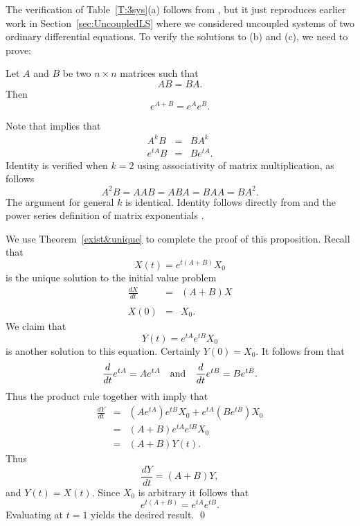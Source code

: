 The verification of Table~\ref{T:3sys}(a) follows from , but
it just reproduces earlier work in Section~\ref{sec:UncoupledLS} where we
considered uncoupled systems of two ordinary differential equations.
To verify the solutions to (b) and (c), we need to prove:

\begin{prop}  \label{P:expAB}
Let $A$ and $B$ be two $n\times n$ matrices such that
\begin{equation} \label{e:AB=BA}
AB = BA.
\end{equation}
Then
\[
e^{A+B} = e^A e^B.
\]
\end{prop} 

\proof  Note that  implies that
\begin{eqnarray}
A^kB    & = & BA^k  \label{e:AkB=BAk}\\
e^{tA}B & = & Be^{tA}. \label{e:etAB=BetA}
\end{eqnarray}
Identity  is verified when $k=2$ using
associativity of matrix multiplication, as follows
\[
A^2B = AAB = ABA = BAA = BA^2.
\]
The argument for general $k$ is identical.  Identity
 follows directly from  and
the power series definition of matrix exponentials .

We use Theorem~\ref{exist&unique}  to complete the proof of this
proposition.  Recall that
\[
X(t) = e^{t(A+B)}X_0
\]
is the unique solution to the initial value problem
\begin{eqnarray*}
\frac{dX}{dt} & = & (A+B)X \\ \\
X(0) & = & X_0.
\end{eqnarray*}
We claim that
\[
Y(t) = e^{tA}e^{tB}X_0
\]
is another solution to this equation.  Certainly $Y(0)=X_0$.  It
follows from  that
\[
\frac{d}{dt}e^{tA} = Ae^{tA} \quad\mbox{and}\quad \frac{d}{dt}e^{tB} = Be^{tB}.
\]
Thus the product rule together with  imply that
\begin{eqnarray*}
\frac{dY}{dt} & = & \left(Ae^{tA}\right)e^{tB}X_0 +
e^{tA}\left(Be^{tB}\right)X_0 \\
& = & (A+B) e^{tA} e^{tB} X_0\\
& = & (A+B)Y(t).
\end{eqnarray*}
Thus
\[
\frac{dY}{dt} = (A+B)Y,
\]
and $Y(t)=X(t)$.  Since $X_0$ is arbitrary it follows that
\[
e^{t(A+B)} = e^{tA}e^{tB}.
\]
Evaluating at $t=1$ yields the desired result.  \qed

